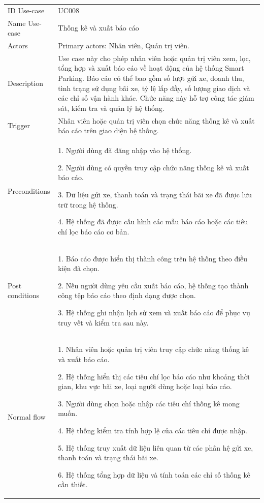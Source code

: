 \renewcommand{\arraystretch}{1.4}
\begin{center}
\begin{longtable}{|m{2.5cm}|m{13cm}|}
\hline
ID Use-case  & UC008 \\ 
Name Use-case & Thống kê và xuất báo cáo \\ 
\hline
Actors & Primary actors: Nhân viên, Quản trị viên.\\
\hline
Description & Use case này cho phép nhân viên hoặc quản trị viên xem, lọc, tổng hợp và xuất báo cáo về hoạt động của hệ thống Smart Parking. Báo cáo có thể bao gồm số lượt gửi xe, doanh thu, tình trạng sử dụng bãi xe, tỷ lệ lấp đầy, số lượng giao dịch và các chỉ số vận hành khác. Chức năng này hỗ trợ công tác giám sát, kiểm tra và quản lý hệ thống. \\ \hline
Trigger & Nhân viên hoặc quản trị viên chọn chức năng thống kê và xuất báo cáo trên giao diện hệ thống.\\
\hline
Preconditions & 
1. Người dùng đã đăng nhập vào hệ thống.

2. Người dùng có quyền truy cập chức năng thống kê và xuất báo cáo.

3. Dữ liệu gửi xe, thanh toán và trạng thái bãi xe đã được lưu trữ trong hệ thống.

4. Hệ thống đã được cấu hình các mẫu báo cáo hoặc các tiêu chí lọc báo cáo cơ bản.\\
\hline
Post conditions & 
1. Báo cáo được hiển thị thành công trên hệ thống theo điều kiện đã chọn.

2. Nếu người dùng yêu cầu xuất báo cáo, hệ thống tạo thành công tệp báo cáo theo định dạng được chọn.

3. Hệ thống ghi nhận lịch sử xem và xuất báo cáo để phục vụ truy vết và kiểm tra sau này.\\
\hline
Normal flow & 
1. Nhân viên hoặc quản trị viên truy cập chức năng thống kê và xuất báo cáo.

2. Hệ thống hiển thị các tiêu chí lọc báo cáo như khoảng thời gian, khu vực bãi xe, loại người dùng hoặc loại báo cáo.

3. Người dùng chọn hoặc nhập các tiêu chí thống kê mong muốn.

4. Hệ thống kiểm tra tính hợp lệ của các tiêu chí được nhập.

5. Hệ thống truy xuất dữ liệu liên quan từ các phân hệ gửi xe, thanh toán và trạng thái bãi xe.

6. Hệ thống tổng hợp dữ liệu và tính toán các chỉ số thống kê cần thiết.


\end{longtable}
\end{center}
